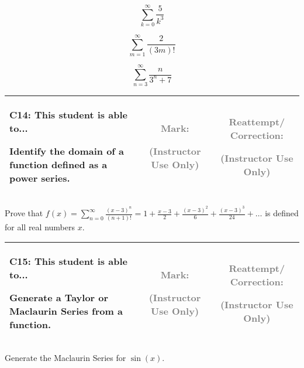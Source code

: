 \documentclass[12pt]{article}
\newcommand{\standardQuestion}[2]{
\newpage
\begin{center}
  \begin{tabular}{|l|c|c|}
  \hline
    \parbox{4in}{
      \textbf{#1}: This student is able to...\\
      #2
    }
  &
    \parbox{1in}{
      \vspace{0.1in}
      \footnotesize \textcolor{gray}{Mark:}
      \vspace{0.7in}

      \tiny \textcolor{gray}{(Instructor Use Only)}
    }
  &
    \parbox{1in}{
      \vspace{0.1in}
      \footnotesize \textcolor{gray}{Reattempt/ Correction:}
      \vspace{0.53in}

      \tiny \textcolor{gray}{(Instructor Use Only)}
    }
  \\\hline
  \end{tabular}
\end{center}
}
\begin{document}
\begin{multicols}{3}
\[\sum_{k=0}^\infty \frac{5}{k^3}\]

\[\sum_{m=1}^\infty \frac{2}{(3m)!}\]

\[\sum_{n=3}^\infty \frac{n}{3^n+7}\]
\end{multicols}


\standardQuestion{C14}{
  Identify the domain of a function defined as a power series.
}

Prove that
\(\displaystyle
  f(x)=
  \sum_{n=0}^\infty\frac{(x-3)^n}{(n+1)!}=
  1+\frac{x-3}{2}+\frac{(x-3)^2}{6}+\frac{(x-3)^3}{24}+\dots
\)
is defined for all real numbers \(x\).


\standardQuestion{C15}{
  Generate a Taylor or Maclaurin Series from a function.
}

Generate the Maclaurin Series for \(\sin(x)\).





%
%
%
%
%
%
%
%
%
%
%



%
%
%
%
%
%
%
%
%
%
%
%
%
%
%
%
\end{document}
